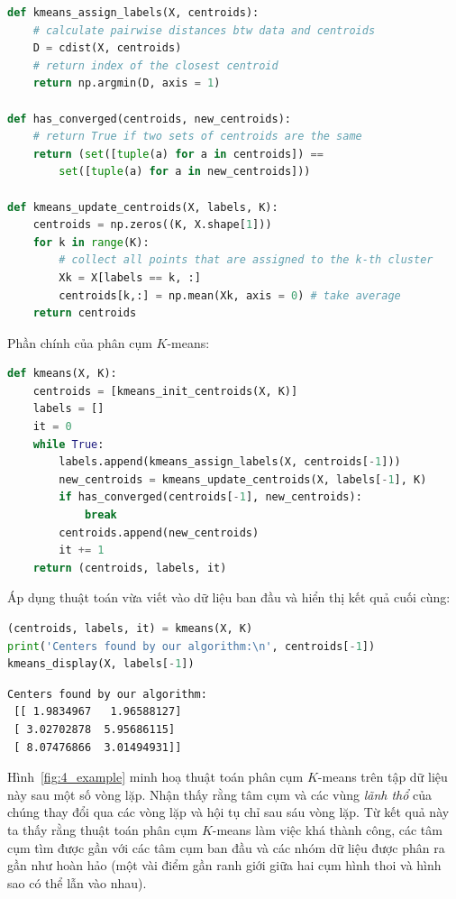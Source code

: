 \begin{lstlisting}[language=Python]
def kmeans_assign_labels(X, centroids):
    # calculate pairwise distances btw data and centroids
    D = cdist(X, centroids)
    # return index of the closest centroid
    return np.argmin(D, axis = 1)

def has_converged(centroids, new_centroids):
    # return True if two sets of centroids are the same
    return (set([tuple(a) for a in centroids]) ==
        set([tuple(a) for a in new_centroids]))

def kmeans_update_centroids(X, labels, K):
    centroids = np.zeros((K, X.shape[1]))
    for k in range(K):
        # collect all points that are assigned to the k-th cluster
        Xk = X[labels == k, :]
        centroids[k,:] = np.mean(Xk, axis = 0) # take average 
    return centroids
\end{lstlisting}
Phần chính của phân cụm $K$-means:


\begin{lstlisting}[language=Python]
def kmeans(X, K):
    centroids = [kmeans_init_centroids(X, K)]
    labels = []
    it = 0
    while True:
        labels.append(kmeans_assign_labels(X, centroids[-1]))
        new_centroids = kmeans_update_centroids(X, labels[-1], K)
        if has_converged(centroids[-1], new_centroids):
            break
        centroids.append(new_centroids)
        it += 1
    return (centroids, labels, it)
\end{lstlisting}

Áp dụng thuật toán vừa viết vào dữ liệu ban đầu và hiển thị kết quả cuối cùng:


\begin{lstlisting}[language=Python]
(centroids, labels, it) = kmeans(X, K)
print('Centers found by our algorithm:\n', centroids[-1])
kmeans_display(X, labels[-1])
\end{lstlisting}
\kq
\begin{lstlisting}
Centers found by our algorithm:
 [[ 1.9834967   1.96588127]
 [ 3.02702878  5.95686115]
 [ 8.07476866  3.01494931]]
\end{lstlisting}


Hình~\ref{fig:4_example} minh hoạ thuật toán phân cụm $K$-means trên tập dữ
liệu này sau một số vòng lặp. Nhận thấy rằng tâm cụm và các vùng
\textit{lãnh thổ} của chúng thay đổi qua các vòng lặp và hội tụ chỉ sau sáu vòng
lặp. Từ kết quả này ta thấy rằng thuật toán phân cụm $K$-means làm việc
khá thành công, các tâm cụm tìm được gần với các tâm cụm ban đầu và các nhóm
dữ liệu được phân ra gần như hoàn hảo (một vài điểm gần ranh giới giữa hai
cụm hình thoi và hình sao có thể lẫn vào nhau).

